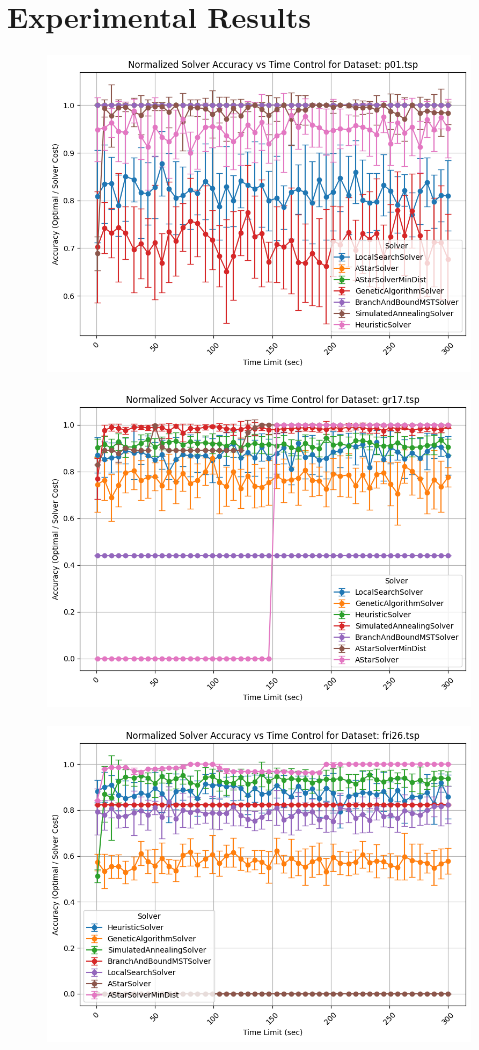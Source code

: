 \documentclass[11pt]{article}
\begin{document}
	\section{Experimental Results}
	
	\begin{figure}[H]
		\centering
		\includegraphics[width=0.7\linewidth]{figures/accuracy_line_p01.tsp}
		\caption{}
		\label{fig:accuracylinep01}
	\end{figure}
	\begin{figure}[H]
		\centering
		\includegraphics[width=0.7\linewidth]{figures/accuracy_line_gr17.tsp}
		\caption{}
		\label{fig:accuracylinegr17}
	\end{figure}
	\begin{figure}[H]
		\centering
		\includegraphics[width=0.7\linewidth]{figures/accuracy_line_fri26.tsp}
		\caption{}
		\label{fig:accuracylinefri26}
	\end{figure}
\end{document}
